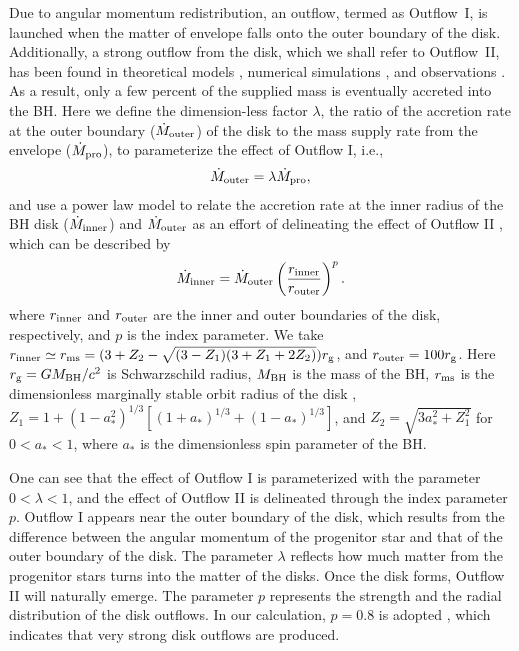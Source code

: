 \documentclass[twocolumn]{aastex6}
\def\beq{\begin{eqnarray}}
\def\eeq{\end{eqnarray}}
\begin{document}
Due to angular momentum redistribution, an outflow, termed as Outflow~I, is launched when the matter of envelope falls onto the outer boundary of the disk. Additionally, a strong outflow from the disk, which we shall refer to Outflow~II, has been found in theoretical models \citep[e.g.,][]{Liu2008,Gu2015}, numerical simulations \citep[e.g.,][]{Yuan2014,Jiang2014,Sadowski2015}, and observations \citep[e.g.,][]{Wang2013,Cheung2016,Parker2017}. As a result, only a few percent of the supplied mass is eventually accreted into the BH. Here we define the dimension-less factor $\lambda$, the ratio of the accretion rate at the outer boundary ($\dot M_{\rm outer}$) of the disk to the mass supply rate from the envelope ($\dot M_{\rm pro}$), to parameterize the effect of Outflow I, i.e.,
\beq
\dot{M}_{\rm outer}=\lambda\dot{M}_{\rm pro},
\label{eq:Outflow-I}
\eeq
and use a power law model to relate the accretion rate at the inner radius of the BH disk ($\dot M_{\rm inner}$) and $\dot M_{\rm outer}$ as an effort of delineating the effect of Outflow II \citep[e.g.,][]{Blandford1999,Yuan2012,Yuan2014,Sadowski2015}, which can be described by
\beq
\dot{M}_{\rm inner}=\dot{M}_{\rm outer} \left(\frac{r_{\rm inner}}{r_{\rm outer}} \right)^{p}.
\label{eq:Outflow-II}
\eeq
where $r_{\rm inner}$ and $r_{\rm outer}$ are the inner and outer boundaries of the disk, respectively, and $p$ is the index parameter. We take $r_{\rm inner}\simeq r_{\rm ms}=(3+Z_{2}-\sqrt{(3-Z_{1})(3+Z_{1}+2Z_{2})})r_{\rm g}$, and $r_{\rm outer}=100 r_{\rm g}$. Here $r_{\rm g}=GM_{\rm BH}/c^{2}$ is Schwarzschild radius, $M_{\rm BH}$ is the mass of the BH, $r_{\rm ms}$ is the dimensionless marginally stable orbit radius of the disk \citep[e.g.,][]{Bardeen1972,Kato2008}, $Z_{1}=1+(1-a_*^{2})^{1/3}[(1+a_*)^{1/3}+(1-a_*)^{1/3}]$, and $Z_{2}=\sqrt{3a_*^{2}+Z_{1}^{2}}$ for $0 < a_* <1$, where $a_*$ is the dimensionless spin parameter of the BH.

One can see that the effect of Outflow I is parameterized with the parameter $0 < \lambda < 1$, and the effect of Outflow II is delineated through the index parameter $p$. Outflow I appears near the outer boundary of the disk, which results from the difference between the angular momentum of the progenitor star and that of the outer boundary of the disk. The parameter $\lambda$ reflects how much matter from the progenitor stars turns into the matter of the disks. Once the disk forms, Outflow II will naturally emerge. The parameter $p$ represents the strength and the radial distribution of the disk outflows. In our calculation, $p=0.8$ is adopted \citep[e.g.,][]{Yuan2012,Yuan2014,Sadowski2015}, which indicates that very strong disk outflows are produced.
\end{document}
